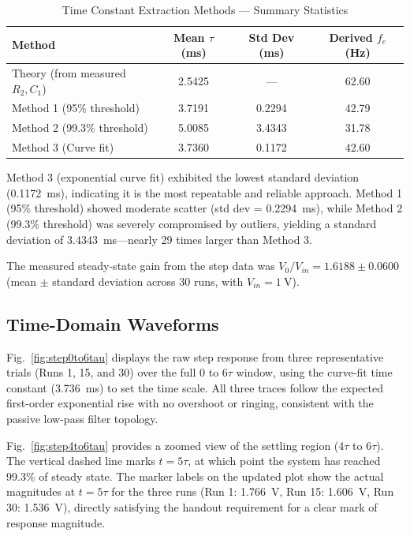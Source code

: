 \documentclass[11pt]{article}
\begin{document}
\begin{table}[H]
  \centering
  \caption{Time Constant Extraction Methods — Summary Statistics}
  \label{tab:tau_summary}
  \begin{tabular}{lSSS}
    \toprule
    \textbf{Method} & \textbf{Mean $\tau$ (ms)} & \textbf{Std Dev (ms)} & \textbf{Derived $f_c$ (Hz)} \\
    \midrule
    Theory (from measured $R_2,C_1$) & 2.5425                   & —                    & 62.60 \\
    Method 1 (95\% threshold)   & 3.7191                   & 0.2294               & 42.79 \\
    Method 2 (99.3\% threshold) & 5.0085                   & 3.4343               & 31.78 \\
    Method 3 (Curve fit)        & 3.7360                   & 0.1172               & 42.60 \\
    \bottomrule
  \end{tabular}
\end{table}

Method 3 (exponential curve fit) exhibited the lowest standard deviation (\SI{0.1172}{\milli\second}), indicating it is the most repeatable and reliable approach. Method 1 (95\% threshold) showed moderate scatter (std dev = \SI{0.2294}{\milli\second}), while Method 2 (99.3\% threshold) was severely compromised by outliers, yielding a standard deviation of \SI{3.4343}{\milli\second}---nearly 29 times larger than Method 3.

The measured steady-state gain from the step data was $V_0/V_{in} = 1.6188 \pm 0.0600$ (mean $\pm$ standard deviation across 30 runs, with $V_{in}=\SI{1}{\volt}$).

\subsection{Time-Domain Waveforms}
Fig.~\ref{fig:step0to6tau} displays the raw step response from three representative trials (Runs 1, 15, and 30) over the full 0 to 6$\tau$ window, using the curve-fit time constant (\SI{3.736}{\milli\second}) to set the time scale. All three traces follow the expected first-order exponential rise with no overshoot or ringing, consistent with the passive low-pass filter topology.

Fig.~\ref{fig:step4to6tau} provides a zoomed view of the settling region (4$\tau$ to 6$\tau$). The vertical dashed line marks $t = 5\tau$, at which point the system has reached 99.3\% of steady state. The marker labels on the updated plot show the actual magnitudes at $t=5\tau$ for the three runs (Run 1: \SI{1.766}{\volt}, Run 15: \SI{1.606}{\volt}, Run 30: \SI{1.536}{\volt}), directly satisfying the handout requirement for a clear mark of response magnitude.
\end{document}

